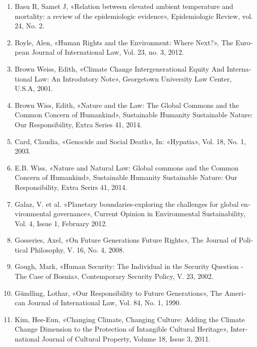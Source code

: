 {\begin{latin}
{\begin{enumerate}
		
		
		\item 	Basu R, Samet J, «Relation between elevated ambient temperature and mortality: a review of the epidemiologic evidence», Epidemiologic Review, vol. 24, No. 2.
		
		\item Boyle, Alen, «Human Rights and the Environment: Where Next?», The European Journal of International Law, Vol. 23, no. 3, 2012.
		
		\item	Brown Weiss, Edith, «Climate Change Intergenerational Equity And International Law: An Introdutory Note», Georgetown University Law Center, U.S.A, 2001.
		
		
		\item Brown Wiss, Edith, «Nature and the Law: The Global Commons and the Common Concern of Humankind», Sustainable Humanity Sustainable Nature: Our Responsibility, Extra Series 41, 2014.
		
		
		\item Card, Claudia, «Genocide and Social Death», In: «Hypatia», Vol. 18, No. 1, 2003.
		
	
		
		\item E.B. Wiss, «Nature and Natural Law: Global commons and the Common Concern of Humankind», Sustainable Humanity Sustainable Nature: Our Responsibility, Extra Serirs 41, 2014.
		
		
		\item Galaz, V. et al. «Planetary boundaries-exploring the challenges for global environmental governance», Current Opinion in Environmental Sustainability, Vol. 4, Issue 1, February 2012.
		
		
		\item Gosseries, Axel, «On Future Generations Future Rights», The Journal of Political Philosophy, V. 16, No. 4, 2008.
		
		\item Gough, Mark, «Human Security: The Individual in the Security Question - The Case of Bosnia», Contemporary Security Policy, V. 23, 2002.
		
		\item Gündling, Lothar, «Our Responsibility to Future Generations», The American Journal of International Law, Vol. 84, No. 1, 1990.
		  
		  \item Kim, Hee-Eun, «Changing Climate, Changing Culture: Adding the Climate Change Dimension to the Protection of Intangible Cultural Heritage», International Journal of Cultural Property, Volume 18,  Issue 3, 2011.
		  

\end{enumerate}}
\end{latin}}

